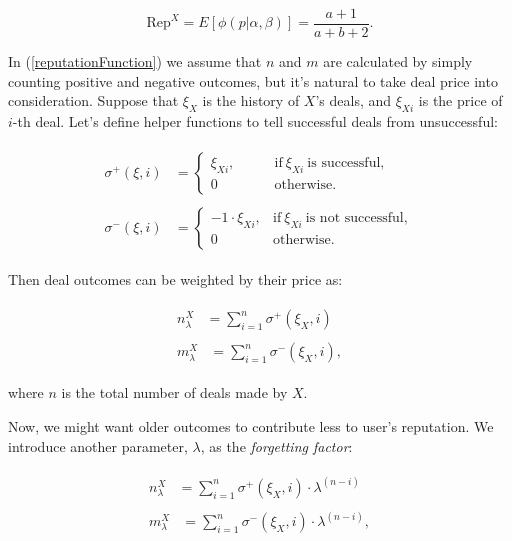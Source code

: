 \documentclass[11pt]{article}
\begin{document}
\begin{equation} \label{reputationFunction}
\text{Rep}^{X} = E[\phi(p | \alpha, \beta)] = \frac{a + 1}{a + b + 2}.
\end{equation}

In (\ref{reputationFunction}) we assume that $ n $ and $ m $ are calculated by simply counting positive and negative outcomes, but it's natural to take deal price into consideration. Suppose that $ \xi_{X} $ is the history of $ X $'s deals, and $ \xi_{Xi} $ is the price of $ i $-th deal. Let's define helper functions to tell successful deals from unsuccessful:

\begin{align}
\begin{split}
\sigma^{+}(\xi, i) {}& = \begin{cases} \xi_{Xi}, \qquad & \text{if}\ \xi_{Xi}\ \mbox{is successful}, \\ 0 & \mbox{otherwise.} \end{cases}
\end{split} \\
\begin{split}
\sigma^{-}(\xi, i) {}& = \begin{cases} -1 \cdot \xi_{Xi}, & \text{if}\ \xi_{Xi}\ \mbox{is not successful}, \\ 0 & \mbox{otherwise.} \end{cases}
\end{split}
\end{align}

Then deal outcomes can be weighted by their price as:

\begin{align}
\begin{split}
n_{\lambda}^{X} {}& = \sum_{i = 1}^{n} \sigma^{+}(\xi_X, i)
\end{split} \\
\begin{split}
m_{\lambda}^{X} {}& = \sum_{i = 1}^{n} \sigma^{-}(\xi_X, i),
\end{split}
\end{align}

where $ n $ is the total number of deals made by $ X $.

Now, we might want older outcomes to contribute less to user's reputation. We introduce another parameter, $ \lambda $, as the \textit{forgetting factor}:

\begin{align}
\begin{split}
n_{\lambda}^{X} {}& = \sum_{i = 1}^{n} \sigma^{+}(\xi_X, i) \cdot \lambda^{(n - i)}
\end{split} \\
\begin{split}
m_{\lambda}^{X} {}& = \sum_{i = 1}^{n} \sigma^{-}(\xi_X, i) \cdot \lambda^{(n - i)},
\end{split}
\end{align}
\end{document}

